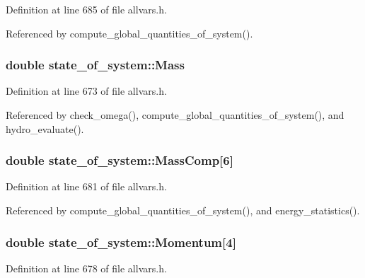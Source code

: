 Definition at line 685 of file allvars.h.



Referenced by compute\_\-global\_\-quantities\_\-of\_\-system().

\hypertarget{structstate__of__system_a8a3263df2542de95325b0684814dab52}{
\subsubsection[{Mass}]{\setlength{\rightskip}{0pt plus 5cm}double {\bf state\_\-of\_\-system::Mass}}}
\label{structstate__of__system_a8a3263df2542de95325b0684814dab52}


Definition at line 673 of file allvars.h.



Referenced by check\_\-omega(), compute\_\-global\_\-quantities\_\-of\_\-system(), and hydro\_\-evaluate().

\hypertarget{structstate__of__system_a760dbd458028ff092d8fab04f54f90ff}{
\subsubsection[{MassComp}]{\setlength{\rightskip}{0pt plus 5cm}double {\bf state\_\-of\_\-system::MassComp}\mbox{[}6\mbox{]}}}
\label{structstate__of__system_a760dbd458028ff092d8fab04f54f90ff}


Definition at line 681 of file allvars.h.



Referenced by compute\_\-global\_\-quantities\_\-of\_\-system(), and energy\_\-statistics().

\hypertarget{structstate__of__system_a052f3f69811197adc33ecb8c4c1f8d6e}{
\subsubsection[{Momentum}]{\setlength{\rightskip}{0pt plus 5cm}double {\bf state\_\-of\_\-system::Momentum}\mbox{[}4\mbox{]}}}
\label{structstate__of__system_a052f3f69811197adc33ecb8c4c1f8d6e}


Definition at line 678 of file allvars.h.



